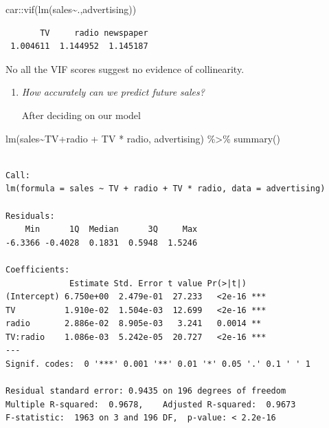 \documentclass[
  letterpaper,
  DIV=11,
  numbers=noendperiod]{scrreprt}
\newenvironment{Shaded}{\begin{snugshade}}{\end{snugshade}}
\newcommand{\FunctionTok}[1]{\textcolor[rgb]{0.02,0.16,0.49}{#1}}
\newcommand{\NormalTok}[1]{\textcolor[rgb]{0.33,0.33,0.33}{#1}}
\newcommand{\SpecialCharTok}[1]{\textcolor[rgb]{0.00,0.46,0.62}{#1}}
\begin{document}
\begin{Shaded}
\begin{Highlighting}[]
\NormalTok{car}\SpecialCharTok{::}\FunctionTok{vif}\NormalTok{(}\FunctionTok{lm}\NormalTok{(sales}\SpecialCharTok{\textasciitilde{}}\NormalTok{.,advertising))}
\end{Highlighting}
\end{Shaded}

\begin{verbatim}
       TV     radio newspaper 
 1.004611  1.144952  1.145187 
\end{verbatim}

No all the VIF scores suggest no evidence of collinearity.

\begin{enumerate}
\def\labelenumi{\arabic{enumi}.}
\setcounter{enumi}{4}
\item
  \emph{How accurately can we predict future sales?}

  After deciding on our model
\end{enumerate}

\begin{Shaded}
\begin{Highlighting}[]
\FunctionTok{lm}\NormalTok{(sales}\SpecialCharTok{\textasciitilde{}}\NormalTok{TV}\SpecialCharTok{+}\NormalTok{radio }\SpecialCharTok{+}\NormalTok{ TV }\SpecialCharTok{*}\NormalTok{ radio, advertising) }\SpecialCharTok{\%\textgreater{}\%} \FunctionTok{summary}\NormalTok{()}
\end{Highlighting}
\end{Shaded}

\begin{verbatim}

Call:
lm(formula = sales ~ TV + radio + TV * radio, data = advertising)

Residuals:
    Min      1Q  Median      3Q     Max 
-6.3366 -0.4028  0.1831  0.5948  1.5246 

Coefficients:
             Estimate Std. Error t value Pr(>|t|)    
(Intercept) 6.750e+00  2.479e-01  27.233   <2e-16 ***
TV          1.910e-02  1.504e-03  12.699   <2e-16 ***
radio       2.886e-02  8.905e-03   3.241   0.0014 ** 
TV:radio    1.086e-03  5.242e-05  20.727   <2e-16 ***
---
Signif. codes:  0 '***' 0.001 '**' 0.01 '*' 0.05 '.' 0.1 ' ' 1

Residual standard error: 0.9435 on 196 degrees of freedom
Multiple R-squared:  0.9678,    Adjusted R-squared:  0.9673 
F-statistic:  1963 on 3 and 196 DF,  p-value: < 2.2e-16
\end{verbatim}
\end{document}
